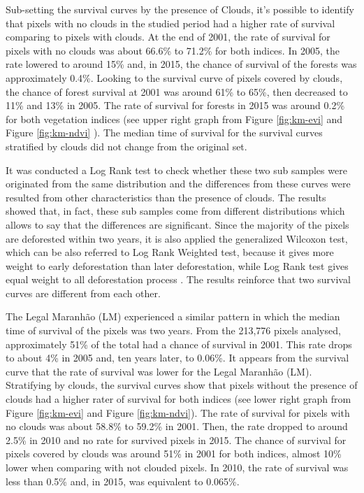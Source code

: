 
Sub-setting the survival curves by the presence of Clouds, it's possible to identify that pixels with no clouds in the studied period had a higher rate of survival comparing to pixels with clouds. At the end of 2001, the rate of survival for pixels with no clouds was about 66.6\% to 71.2\% for both indices. In 2005, the rate lowered to around 15\% and, in 2015, the chance of survival of the forests was approximately 0.4\%. Looking to the survival curve of pixels covered by clouds, the chance of forest survival at 2001 was around 61\% to 65\%, then decreased to 11\% and 13\% in 2005. The rate of survival for forests in 2015 was around 0.2\% for both vegetation indices (see upper right graph from Figure \ref{fig:km-evi} and Figure \ref{fig:km-ndvi} ). The median time of survival for the survival curves stratified by clouds did not change from the original set. 



It was conducted a Log Rank test \citep{Peto_1972} to check whether these two sub samples were originated from the same distribution and the differences from these curves were resulted from other characteristics than the presence of clouds. The results showed that, in fact, these sub samples come from different distributions which allows to say that the differences are significant. Since the majority of the pixels are deforested within two years, it is also applied the generalized Wilcoxon test, which can be also referred to Log Rank Weighted test, because it gives more weight to early deforestation than later deforestation, while Log Rank test gives equal weight to all deforestation process \citep{lee_wang_2003}. The results reinforce that two survival curves are different from each other.

The Legal Maranhão (LM) experienced a similar pattern in which the median time of survival of the pixels was two years. From the 213,776 pixels analysed, approximately 51\% of the total had a chance of survival in 2001. This rate drops to about 4\% in 2005 and, ten years later, to 0.06\%. It appears from the survival curve that the rate of survival was lower for the Legal Maranhão (LM). Stratifying by clouds, the survival curves show that pixels without the presence of clouds had a higher rater of survival for both indices (see lower right graph from Figure \ref{fig:km-evi} and Figure \ref{fig:km-ndvi}). The rate of survival for pixels with no clouds was about 58.8\% to 59.2\% in 2001. Then, the rate dropped to around 2.5\% in 2010 and no rate for survived pixels in 2015. The chance of survival for pixels covered by clouds was around 51\% in 2001 for both indices, almost 10\% lower when comparing with not clouded pixels. In 2010, the rate of survival was less than 0.5\% and, in 2015, was equivalent to 0.065\%. 

